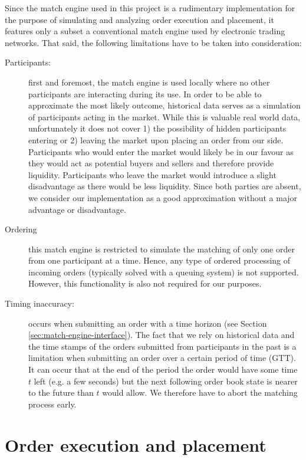 Since the match engine used in this project is a rudimentary implementation for the purpose of simulating and analyzing order execution and placement, it features only a subset a conventional match engine used by electronic trading networks.
That said, the following limitations have to be taken into consideration:
\begin{description}
    \item[Participants:] first and foremost, the match engine is used locally where no other participants are interacting during its use.
    In order to be able to approximate the most likely outcome, historical data serves as a simulation of participants acting in the market.
    While this is valuable real world data, unfortunately it does not cover 1) the possibility of hidden participants entering or 2) leaving the market upon placing an order from our side.
    Participants who would enter the market would likely be in our favour as they would act as potential buyers and sellers and therefore provide liquidity.
    Participants who leave the market would introduce a slight disadvantage as there would be less liquidity.
    Since both parties are absent, we consider our implementation as a good approximation without a major advantage or disadvantage.
    
    \item[Ordering]this match engine is restricted to simulate the matching of only one order from one participant at a time.
    Hence, any type of ordered processing of incoming orders (typically solved with a queuing system) is not supported.
    However, this functionality is also not required for our purposes.
    
    \item[Timing inaccuracy:] occurs when submitting an order with a time horizon (see Section \ref{sec:match-engine-interface}).
    The fact that we rely on historical data and the time stamps of the orders submitted from participants in the past is a limitation when submitting an order over a certain period of time (GTT).
    It can occur that at the end of the period the order would have some time $t$ left (e.g. a few seconds) but the next following order book state is nearer to the future than $t$ would allow.
    We therefore have to abort the matching process early.
    
\end{description}



\section{Order execution and placement}
\label{sec:execution-placement}

